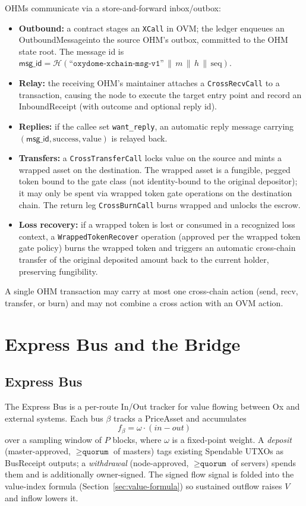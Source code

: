 \documentclass[11pt,a4paper]{article}
\theoremstyle{definition}
\newcommand{\ox}{\textsf{Ox}}
\newcommand{\ovm}{\textsf{OVM}}
\newcommand{\ohms}{OHMs}
\newcommand{\BusReceipt}{\textsf{BusReceipt}}
\newcommand{\InboundReceipt}{\textsf{InboundReceipt}}
\newcommand{\OutboundMessage}{\textsf{OutboundMessage}}
\newcommand{\PriceAsset}{\textsf{PriceAsset}}
\newcommand{\hash}{\mathcal{H}}
\begin{document}
\ohms{} communicate via a store-and-forward inbox/outbox:
\begin{itemize}[leftmargin=2em]
  \item \textbf{Outbound:} a contract stages an \texttt{XCall} in \ovm{}; the
    ledger enqueues an \OutboundMessage into the source OHM's outbox, committed
    to the OHM state root.  The message id is
    $\mathsf{msg\_id} = \hash(\texttt{``oxydome-xchain-msg-v1''}\,\|\,m\,\|\,h\,\|\,\mathrm{seq})$.
  \item \textbf{Relay:} the receiving OHM's maintainer attaches a
    \texttt{CrossRecvCall} to a transaction, causing the node to execute the
    target entry point and record an \InboundReceipt{} (with outcome and optional
    reply id).
  \item \textbf{Replies:} if the callee set \texttt{want\_reply}, an automatic
    reply message carrying $(\mathsf{msg\_id},\mathrm{success},\mathrm{value})$
    is relayed back.
  \item \textbf{Transfers:} a \texttt{CrossTransferCall} locks value on the
    source and mints a wrapped asset on the destination. The wrapped asset
    is a fungible, pegged token bound to the gate class (not identity-bound to
    the original depositor); it may only be spent via wrapped token gate
    operations on the destination chain. The return leg \texttt{CrossBurnCall}
    burns wrapped and unlocks the escrow.
  \item \textbf{Loss recovery:} if a wrapped token is lost or consumed in a
    recognized loss context, a \texttt{WrappedTokenRecover} operation (approved
    per the wrapped token gate policy) burns the wrapped token and triggers an
    automatic cross-chain transfer of the original deposited amount back to the
    current holder, preserving fungibility.
\end{itemize}
A single OHM transaction may carry at most one cross-chain action (send, recv,
transfer, or burn) and may not combine a cross action with an \ovm{} action.

\section{Express Bus and the Bridge}
\label{sec:express-bus}

\subsection{Express Bus}

The Express Bus is a per-route In/Out tracker for value flowing between \ox{}
and external systems.  Each bus $\beta$ tracks a \PriceAsset{} and accumulates
\[
f_\beta = \omega\cdot(\mathit{in} - \mathit{out})
\]
over a sampling window of $P$ blocks, where $\omega$ is a fixed-point weight.
A \emph{deposit} (master-approved, $\ge\texttt{quorum}$ of masters) tags
existing Spendable UTXOs as \BusReceipt{} outputs; a \emph{withdrawal}
(node-approved, $\ge\texttt{quorum}$ of servers) spends them and is additionally
owner-signed.  The signed flow signal is folded into the value-index formula
(Section~\ref{sec:value-formula}) so sustained outflow raises $V$ and
inflow lowers it.
\end{document}
